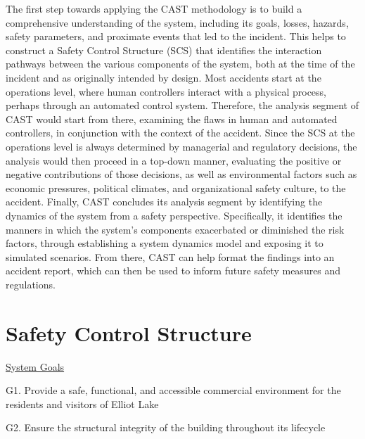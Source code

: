 \documentclass[12pt]{article}
\begin{document}
The first step towards applying the CAST methodology is to build a comprehensive understanding of the system, including its goals, losses, hazards, safety parameters, and proximate events that led to the incident. This helps to construct a Safety Control Structure (SCS) that identifies the interaction pathways between the various components of the system, both at the time of the incident and as originally intended by design. Most accidents start at the operations level, where human controllers interact with a physical process, perhaps through an automated control system. Therefore, the analysis segment of CAST would start from there, examining the flaws in human and automated controllers, in conjunction with the context of the accident. Since the SCS at the operations level is always determined by managerial and regulatory decisions, the analysis would then proceed in a top-down manner, evaluating the positive or negative contributions of those decisions, as well as environmental factors such as economic pressures, political climates, and organizational safety culture, to the accident. Finally, CAST concludes its analysis segment by identifying the dynamics of the system from a safety perspective. Specifically, it identifies the manners in which the system's components exacerbated or diminished the risk factors, through establishing a system dynamics model and exposing it to simulated scenarios. From there, CAST can help format the findings into an accident report, which can then be used to inform future safety measures and regulations.

\section{Safety Control Structure}



\underline{System Goals}

G1. Provide a safe, functional, and accessible commercial environment for the residents and visitors of Elliot Lake

G2. Ensure the structural integrity of the building throughout its lifecycle
\end{document}
